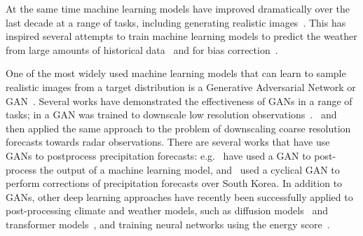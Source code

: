 \documentclass{article}
\begin{document}


At the same time machine learning models have improved dramatically over the last decade at a range of tasks, including generating realistic images~\citep{karras_style-based_2019}. This has inspired several attempts to train machine learning models to predict the weather from large amounts of historical data~\citep{nguyen_climax_2023, bi_pangu-weather_2022,ravuri_skilful_2021, zhang_skilful_2023,lam_graphcast_2022} and for bias correction~\citep{rasp_neural_2018,ben-bouallegue_improving_2023}.

One of the most widely used machine learning models that can learn to sample realistic images from a target distribution is a Generative Adversarial Network or GAN~\citep{goodfellow_generative_2014}. Several works have demonstrated the effectiveness of GANs in a range of tasks; in \cite{leinonen_stochastic_2020} a GAN was trained to downscale low resolution observations~\citep{leinonen_stochastic_2020}.~\cite{harris_generative_2022} and~\cite{price_increasing_2022} then applied the same approach to the problem of downscaling coarse resolution forecasts towards radar observations. There are several works that have use GANs to postprocess precipitation forecasts: e.g.~\cite{duncan_generative_2022} have used a GAN to post-process the output of a machine learning model, and~\cite{jeong_correcting_2023} used a cyclical GAN to perform corrections of precipitation forecasts over South Korea. In addition to GANs, other deep learning approaches have recently been successfully applied to post-processing climate and weather models, such as diffusion models~\citep{li_seeds_2023, addison_machine_2022, leinonen_latent_2023} and transformer models~\citep{ben-bouallegue_improving_2023}, and training neural networks using the energy score~\cite{pacchiardi_probabilistic_2021}.
\end{document}
